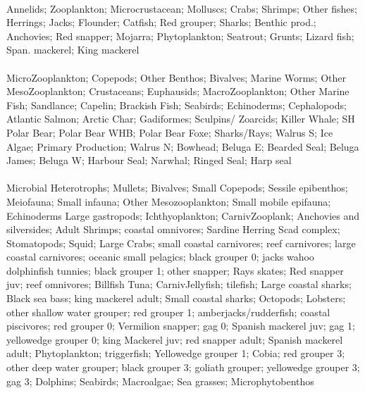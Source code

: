 \fullhline
\hline
{} \\
\hline
Annelids; Zooplankton; Microcrustacean; Molluscs; Crabs; Shrimps; Other fishes; Herrings; Jacks; Flounder; Catfish; Red grouper; Sharks; Benthic prod.; Anchovies; Red snapper; Mojarra; Phytoplankton; Seatrout; Grunts; Lizard fish; Span. mackerel; King mackerel\\
\fullhline
\hline
{} \\
\hline
MicroZooplankton; Copepods; Other Benthos; Bivalves; Marine Worms; Other MesoZooplankton; Crustaceans; Euphausids; MacroZooplankton; Other Marine Fish; Sandlance; Capelin; Brackish Fish; Seabirds; Echinoderms; Cephalopods; Atlantic Salmon; Arctic Char; Gadiformes; Sculpins/ Zoarcids; Killer Whale; SH Polar Bear; Polar Bear WHB; Polar Bear Foxe; Sharks/Rays; Walrus S; Ice Algae; Primary Production; Walrus N; Bowhead; Beluga E; Bearded Seal; Beluga James; Beluga W; Harbour Seal; Narwhal; Ringed Seal; Harp seal\\
\fullhline
\hline
{} \\
\hline
Microbial Heterotrophs; Mullets; Bivalves; Small Copepods; Sessile epibenthos; Meiofauna; Small infauna; Other Mesozooplankton; Small mobile epifauna; Echinoderms Large gastropods; Ichthyoplankton; CarnivZooplank; Anchovies and silversides; Adult Shrimps; coastal omnivores; Sardine Herring Scad complex; Stomatopods; Squid; Large Crabs; small coastal carnivores; reef carnivores; large coastal carnivores; oceanic small pelagics; black grouper 0; jacks wahoo dolphinfish tunnies; black grouper 1; other snapper; Rays skates; Red snapper juv; reef omnivores; Billfish Tuna; CarnivJellyfish; tilefish; Large coastal sharks; Black sea bass; king mackerel adult; Small coastal sharks; Octopods; Lobsters; other shallow water grouper; red grouper 1; amberjacks/rudderfish; coastal piscivores; red grouper 0; Vermilion snapper; gag 0; Spanish mackerel juv; gag 1; yellowedge grouper 0; king Mackerel juv; red snapper adult; Spanish mackerel adult; Phytoplankton; triggerfish; Yellowedge grouper 1; Cobia; red grouper 3; other deep water grouper; black grouper 3; goliath grouper; yellowedge grouper 3; gag 3; Dolphins; Seabirds; Macroalgae; Sea grasses; Microphytobenthos\\
\fullhline
\hline
{} \\
